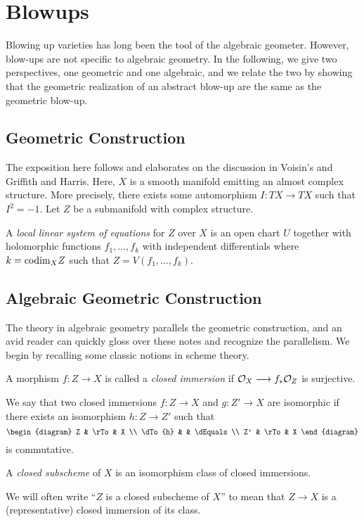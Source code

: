 \section{Blowups}
\newcommand{\CP}{\mathbb{CP}}
\newcommand{\del}{\partial}

Blowing up varieties has long been the tool of the algebraic
geometer. However, blow-ups are not specific to algebraic geometry.
In the following, we give two perspectives, one geometric and one
algebraic, and we relate the two by showing that the geometric
realization of an abstract blow-up are the same as the geometric
blow-up.

\subsection{Geometric Construction}

The exposition here follows and elaborates on the discussion in
Voisin's and Griffith and Harris. Here, $X$ is a smooth manifold
emitting an almost complex structure. More precisely, there exists
some automorphism $I: TX \to TX$ such that $I^2 = -1$. Let $Z$ be
a submanifold with complex structure.

\begin{definition}
A \emph{local linear system of equations} for $Z$ over $X$ is an
open chart $U$ together with holomorphic functions $f_1,\dots,
f_k$ with independent differentials where $k = \mathrm{codim}_X Z$ such 
that $Z = V(f_1,\dots,f_k)$. 
\end{definition}

\begin{prop}

\end{prop}

\subsection{Algebraic Geometric Construction}

The theory in algebraic geometry parallels the geometric 
construction, and an avid reader can quickly gloss over these
notes and recognize the parallelism. We begin by recalling 
some classic notions in scheme theory.

\begin{definition}
A morphism $f: Z \to X$ is called a \emph{closed immersion} if $\mathcal{O}_X \longrightarrow 
f_*\mathcal{O}_Z$ is surjective.
\end{definition}

We say that two closed immersions $f: Z \to X$ and $g: Z' \to X$ 
are isomorphic if there exists an isomorphism $h: Z \to Z'$ such 
that
\[
\begin{diagram}
Z       & \rTo & X        \\
\dTo{h} &      & \dEquals \\
Z'      & \rTo & X
\end{diagram}
\]
is commutative.

\begin{definition}
A \emph{closed subscheme} of $X$ is an isomorphism class of 
closed immersions. 
\end{definition}

We will often write ``$Z$ is a closed subscheme of $X$'' to mean 
that $Z \to X$ is a (representative) closed immersion of its class.

\begin{prop}
\end{prop}
